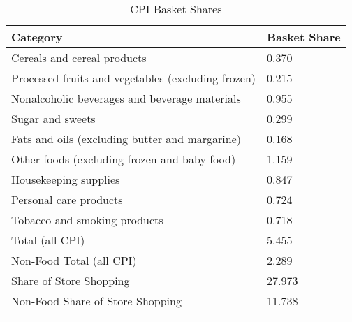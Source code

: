 \begin{table}[] \centering
  \caption{CPI Basket Shares}
  \label{tab:cpi}
\begin{tabular}{ll}
\textbf{Category}                               & \textbf{Basket Share} \\
\hline
Cereals and cereal products                     & 0.370 \\
Processed fruits and vegetables (excluding frozen) & 0.215 \\
Nonalcoholic beverages and beverage materials   & 0.955 \\
Sugar and sweets                                & 0.299 \\
Fats and oils (excluding butter and margarine)  & 0.168 \\
Other foods (excluding frozen and baby food)    & 1.159 \\
Housekeeping supplies                           & 0.847 \\
Personal care products                          & 0.724 \\
Tobacco and smoking products                    & 0.718 \\
\hline
Total (all CPI)                                 & 5.455 \\
Non-Food Total (all CPI)                        & 2.289 \\
\hline
Share of Store Shopping                         & 27.973 \\
Non-Food Share of Store Shopping                & 11.738 \\
&
  \end{tabular}
\end{table}
